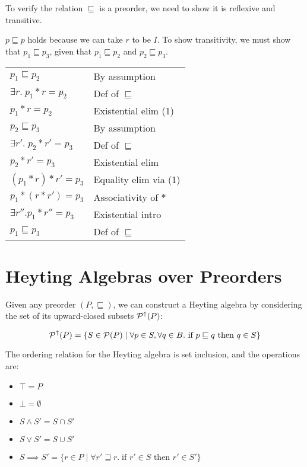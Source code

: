 To verify the relation $\sqsubseteq$ is a preorder, we need to 
show it is reflexive and transitive. 

$p \sqsubseteq p$ holds because we can take $r$ to be $I$. To show 
transitivity, we must show that $p_1 \sqsubseteq p_3$, given
that $p_1 \sqsubseteq p_2$ and $p_2 \sqsubseteq p_3$. 
\\

\begin{tabular}{ll}
$p_1 \sqsubseteq p_2$                 & By assumption  \\
$\exists r.\; p_1 * r = p_2$          & Def of $\sqsubseteq$ \\
$p_1 * r = p_2$                       & Existential elim (1)\\
$p_2 \sqsubseteq p_3$                 & By assumption \\
$\exists r'.\; p_2 * r' = p_3$        & Def of $\sqsubseteq$ \\
$p_2 * r' = p_3$                      & Existential elim \\
$(p_1 * r) * r' = p_3$                & Equality elim via (1) \\
$p_1 * (r * r') = p_3$                & Associativity of $*$ \\
$\exists r''. p_1 * r'' = p_3$        & Existential intro \\
$p_1 \sqsubseteq p_3$                 & Def of $\sqsubseteq$ \\
\end{tabular}

\section{Heyting Algebras over Preorders}

Given any preorder $(P, \sqsubseteq)$, we can construct a Heyting
algebra by considering the set of its upward-closed subsets
$\mathcal{P}^{\uparrow}({P})$:

\begin{displaymath}
\mathcal{P}^{\uparrow}({P}) = 
  \{ S \in \mathcal{P}(P) \;|\;
     \forall p \in S, \forall q \in B. \mbox{ if } p \sqsubseteq q \mbox{ then } q \in S 
  \}
\end{displaymath}

The ordering relation for the Heyting algebra is set inclusion, and
the operations are:

\begin{itemize}
\item $\top = P$
\item $\bot = \emptyset$
\item $S \land S' = S \cap S'$
\item $S \vee S' = S \cup S'$
\item $S \implies S' = \{ r \in P \;|\; \forall r' \sqsupseteq r.\; 	
                          \mbox{if } r' \in S \mbox{ then } r' \in S' \}$
\end{itemize}

